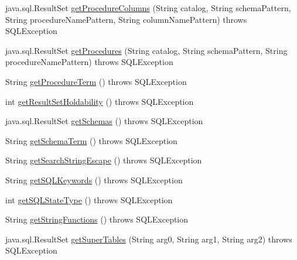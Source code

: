 \begin{DoxyCompactItemize}
\item 
java.\+sql.\+Result\+Set \mbox{\hyperlink{classcom_1_1mysql_1_1cj_1_1jdbc_1_1_database_meta_data_a29901815ccefc6bb74988a76bb8545f1}{get\+Procedure\+Columns}} (String catalog, String schema\+Pattern, String procedure\+Name\+Pattern, String column\+Name\+Pattern)  throws S\+Q\+L\+Exception 
\item 
java.\+sql.\+Result\+Set \mbox{\hyperlink{classcom_1_1mysql_1_1cj_1_1jdbc_1_1_database_meta_data_a07bb00b813f3d19281a9c680df01566a}{get\+Procedures}} (String catalog, String schema\+Pattern, String procedure\+Name\+Pattern)  throws S\+Q\+L\+Exception 
\item 
String \mbox{\hyperlink{classcom_1_1mysql_1_1cj_1_1jdbc_1_1_database_meta_data_ab923813917b7a71a24c5b3067d467694}{get\+Procedure\+Term}} ()  throws S\+Q\+L\+Exception 
\item 
int \mbox{\hyperlink{classcom_1_1mysql_1_1cj_1_1jdbc_1_1_database_meta_data_adf86d6bb0db14b9abb64497d8b14b743}{get\+Result\+Set\+Holdability}} ()  throws S\+Q\+L\+Exception 
\item 
java.\+sql.\+Result\+Set \mbox{\hyperlink{classcom_1_1mysql_1_1cj_1_1jdbc_1_1_database_meta_data_a5826cd5b83c15ae364cbc577f78895d1}{get\+Schemas}} ()  throws S\+Q\+L\+Exception 
\item 
String \mbox{\hyperlink{classcom_1_1mysql_1_1cj_1_1jdbc_1_1_database_meta_data_a694df26784a27fb9bf57e3b94e16878b}{get\+Schema\+Term}} ()  throws S\+Q\+L\+Exception 
\item 
String \mbox{\hyperlink{classcom_1_1mysql_1_1cj_1_1jdbc_1_1_database_meta_data_ae340a42fa7071bbc701cb74bec470c7b}{get\+Search\+String\+Escape}} ()  throws S\+Q\+L\+Exception 
\item 
String \mbox{\hyperlink{classcom_1_1mysql_1_1cj_1_1jdbc_1_1_database_meta_data_aab2c54d10e91a54ade1420ba242372fd}{get\+S\+Q\+L\+Keywords}} ()  throws S\+Q\+L\+Exception 
\item 
int \mbox{\hyperlink{classcom_1_1mysql_1_1cj_1_1jdbc_1_1_database_meta_data_a161502700c7b83b4213afbba31d7a2f6}{get\+S\+Q\+L\+State\+Type}} ()  throws S\+Q\+L\+Exception 
\item 
String \mbox{\hyperlink{classcom_1_1mysql_1_1cj_1_1jdbc_1_1_database_meta_data_a3979e65b1b046ec65231cc83b8481ab5}{get\+String\+Functions}} ()  throws S\+Q\+L\+Exception 
\item 
java.\+sql.\+Result\+Set \mbox{\hyperlink{classcom_1_1mysql_1_1cj_1_1jdbc_1_1_database_meta_data_a6f3cf5ca5844df1c5f7f0f514bfe2bed}{get\+Super\+Tables}} (String arg0, String arg1, String arg2)  throws S\+Q\+L\+Exception 

\end{DoxyCompactItemize}
